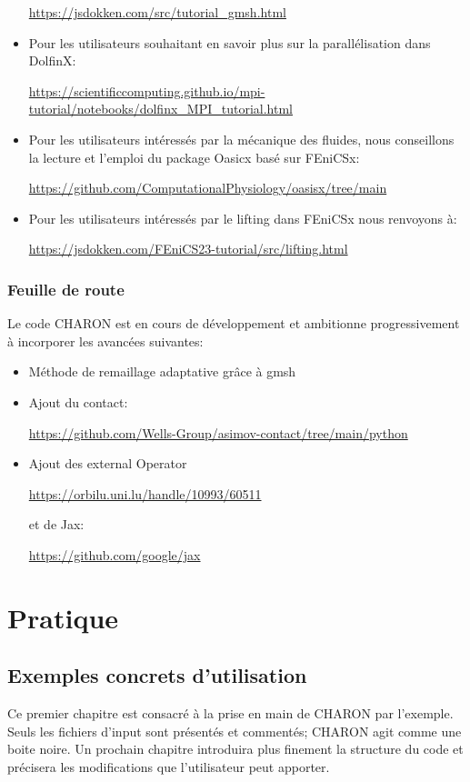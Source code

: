 \documentclass[10pt]{book}
\begin{document}
\begin{itemize}[label=$\star$]
\begin{center}
\url{https://jsdokken.com/src/tutorial_gmsh.html}
\end{center}
\item Pour les utilisateurs souhaitant en savoir plus sur la parallélisation dans DolfinX:
\begin{center}
\url{https://scientificcomputing.github.io/mpi-tutorial/notebooks/dolfinx_MPI_tutorial.html}
\end{center}
\item Pour les utilisateurs intéressés par la mécanique des fluides, nous conseillons la lecture et l'emploi du package Oasicx basé sur FEniCSx:
\begin{center}
\url{https://github.com/ComputationalPhysiology/oasisx/tree/main}
\end{center}
\item Pour les utilisateurs intéressés par le lifting dans FEniCSx nous renvoyons à:
\begin{center}
\url{https://jsdokken.com/FEniCS23-tutorial/src/lifting.html}
\end{center}
\end{itemize}
\section*{Feuille de route}
Le code CHARON est en cours de développement et ambitionne progressivement à incorporer les avancées suivantes:
\begin{itemize}
\item Méthode de remaillage adaptative grâce à gmsh
\item Ajout du contact:
\begin{center}
\url{https://github.com/Wells-Group/asimov-contact/tree/main/python}
\end{center}
\item Ajout des external Operator
\begin{center}
\url{https://orbilu.uni.lu/handle/10993/60511}
\end{center}
et de Jax:
\begin{center}
\url{https://github.com/google/jax}
\end{center}
\end{itemize}
\part{Pratique}\label{Part:Pratique}
\chapter{Exemples concrets d'utilisation}\label{Chapitre:Exemples concrets}
Ce premier chapitre est consacré à la prise en main de CHARON par l'exemple. Seuls les fichiers d'input sont présentés et commentés; CHARON agit comme une boite noire. Un prochain chapitre introduira plus finement la structure du code et précisera les modifications que l'utilisateur peut apporter.
\end{document}
